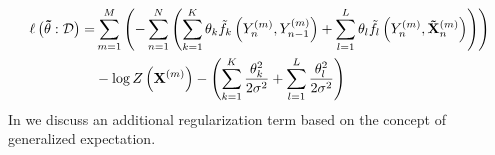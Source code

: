 \begin{equation}
  \label{equ:log-likelihood-linear-chain-crf-log-linear-gaussian}
  \begin{split}
    \ell\left(\mathbf{\tilde{\theta}}:\mathcal{D}\right) = & \sum_{m=1}^M \left(-\sum_{n=1}^N \left(\sum_{k=1}^K\theta_k \tilde{f}_k\left(\vphantom{\tilde{X}}Y_n^{(m)},Y_{n-1}^{(m)}\right)+\sum_{l=1}^L\theta_l \tilde{f}_l\left(Y_n^{(m)},\mathbf{\tilde{X}}_n^{(m)}\right)\right)\right) \\
    & -\log Z\left(\mathbf{X}^{(m)}\right)-\left(\sum_{k=1}^K\frac{\theta_k^2}{2\sigma^2}+\sum_{l=1}^L\frac{\theta_l^2}{2\sigma^2}\right)
 \end{split}
\end{equation}
In  we discuss an additional regularization term based on the concept of \gls{generalized expectation}.

\bigskip

